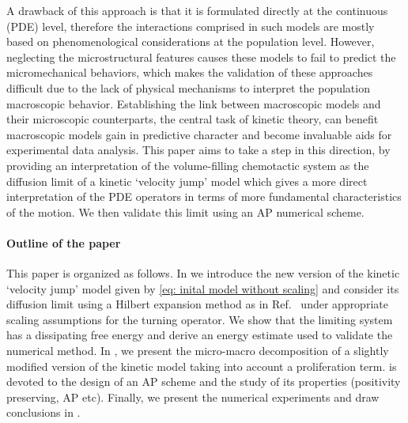 \documentclass[review,onefignum,onetabnum]{siamart220329}
\begin{document}
A drawback of this approach is that it is formulated directly at the continuous (PDE) level, therefore the interactions comprised in such models are mostly based on phenomenological considerations at the population level. However, neglecting the microstructural features causes these models to fail to predict the micromechanical behaviors, which makes the validation of these approaches {difficult} due to the lack of physical mechanisms to interpret the population macroscopic behavior. Establishing the link between macroscopic models and their microscopic counterparts, the central task of kinetic theory, can benefit macroscopic models gain in predictive character and become invaluable aids for experimental data analysis. {This paper aims to take a step in this direction, by providing an interpretation of the volume-filling chemotactic system as the diffusion limit of a kinetic {{`velocity jump'}} model which gives a more direct interpretation of the PDE operators in terms of more fundamental characteristics of the motion.} {We then validate this limit using an AP numerical scheme.}

\paragraph{Outline of the paper} This paper is organized as follows. In  we {introduce the new version of the kinetic `velocity jump' model given by \cref{eq: inital model without scaling}} and consider its diffusion limit using a Hilbert expansion method as in Ref.~\cite{othmer2002diffusion} under appropriate scaling assumptions for the turning operator. We show that the limiting system has a dissipating free energy and derive an energy estimate used to validate the numerical method. {In , we present the micro-macro decomposition of a slightly modified version of the kinetic model taking into account a proliferation term.  is devoted to the design of an AP scheme and the study of its properties (positivity preserving, AP etc). Finally, we present the numerical experiments and draw conclusions in }. 
\end{document}
